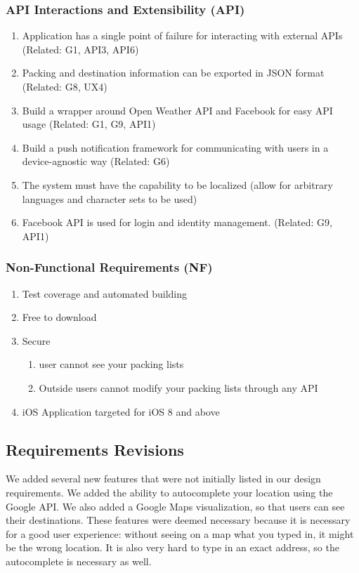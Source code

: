 \documentclass[11pt]{article}
\begin{document}
        \subsubsection{API Interactions and Extensibility (API)}
        \begin{enumerate}
        \item Application has a single point of failure for interacting with external
        APIs (Related: G1, API3, API6)
        \item Packing and destination information can be exported in JSON format
        (Related: G8, UX4)
        \item Build a wrapper around Open Weather API and Facebook for easy API
        usage (Related: G1, G9, API1)
        \item Build a push notification framework for communicating with users in
        a device-agnostic way (Related: G6)
        \item The system must have the capability to be localized (allow for arbitrary
        languages and character sets to be used)
        \item Facebook API is used for login and identity management. (Related:
        G9, API1)
        \end{enumerate}

        \subsubsection{Non-Functional Requirements (NF)}
        \begin{enumerate}
        \item Test coverage and automated building 
        \item Free to download 
        \item Secure 

        \begin{enumerate}
        \item user cannot see your packing lists 
        \item Outside users cannot modify your packing lists through any API 
        \end{enumerate}
        \item iOS Application targeted for iOS 8 and above \end{enumerate}

    \subsection{Requirements Revisions}
    We added several new features that were not initially listed in our design requirements. We added the ability to autocomplete your location using the Google API. We also added a Google Maps visualization, so that users can see their destinations. These features were deemed necessary because it is necessary for a good user experience: without seeing on a map what you typed in, it might be the wrong location. It is also very hard to type in an exact address, so the autocomplete is necessary as well.
\end{document}
